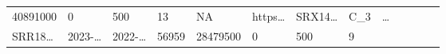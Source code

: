 \documentclass[
]{article}
\begin{document}
\begin{longtable}[]{@{}lllllllllllll@{}}
\begin{minipage}[t]{0.05\columnwidth}
40891000\strut
\end{minipage} & \begin{minipage}[t]{0.05\columnwidth}\raggedright
0\strut
\end{minipage} & \begin{minipage}[t]{0.05\columnwidth}\raggedright
500\strut
\end{minipage} & \begin{minipage}[t]{0.05\columnwidth}\raggedright
13\strut
\end{minipage} & \begin{minipage}[t]{0.05\columnwidth}\raggedright
NA\strut
\end{minipage} & \begin{minipage}[t]{0.05\columnwidth}\raggedright
https\ldots{}\strut
\end{minipage} & \begin{minipage}[t]{0.05\columnwidth}\raggedright
SRX14\ldots{}\strut
\end{minipage} & \begin{minipage}[t]{0.08\columnwidth}\raggedright
C\_3\strut
\end{minipage} & \begin{minipage}[t]{0.02\columnwidth}\raggedright
\ldots{}\strut
\end{minipage}\tabularnewline
\begin{minipage}[t]{0.05\columnwidth}\raggedright
SRR18\ldots{}\strut
\end{minipage} & \begin{minipage}[t]{0.05\columnwidth}\raggedright
2023-\ldots{}\strut
\end{minipage} & \begin{minipage}[t]{0.05\columnwidth}\raggedright
2022-\ldots{}\strut
\end{minipage} & \begin{minipage}[t]{0.04\columnwidth}\raggedright
56959\strut
\end{minipage} & \begin{minipage}[t]{0.05\columnwidth}\raggedright
28479500\strut
\end{minipage} & \begin{minipage}[t]{0.05\columnwidth}\raggedright
0\strut
\end{minipage} & \begin{minipage}[t]{0.05\columnwidth}\raggedright
500\strut
\end{minipage} & \begin{minipage}[t]{0.05\columnwidth}\raggedright
9\strut
\end{minipage} & \begin{minipage}[t]{0.05\columnwidth}\raggedright

\end{minipage}
\end{longtable}
\end{document}
